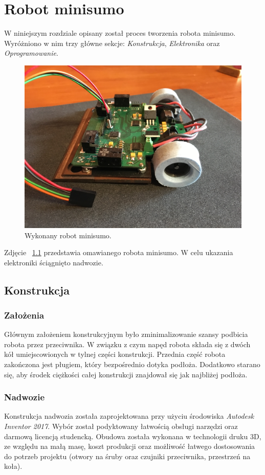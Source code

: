 \chapter{Robot minisumo}

W niniejszym rozdziale opisany został proces tworzenia robota minisumo. Wyróżniono w nim trzy główne sekcje: \textit{Konstrukcja}, \textit{Elektronika} oraz \textit{Oprogramowanie}.

\begin{figure}[H]
	\centering
		\includegraphics[width=0.75\linewidth]{pic04/minisumo.JPG}
	\caption{Wykonany robot minisumo.}
	\label{fig:robot}	
\end{figure}

Zdjęcie ~\ref{fig:robot} przedstawia omawianego robota minisumo. W celu ukazania elektroniki ściągnięto nadwozie.

\section{Konstrukcja}
\subsection{Założenia}
Głównym założeniem konstrukcyjnym było zminimalizowanie szansy podbicia robota przez przeciwnika. W związku z czym napęd robota składa się z dwóch kół umiejscowionych w tylnej części konstrukcji. Przednia część robota zakończona jest pługiem, który bezpośrednio dotyka podłoża. Dodatkowo starano się, aby środek ciężkości całej konstrukcji znajdował się jak najbliżej podłoża.

\subsection{Nadwozie}
Konstrukcja nadwozia została zaprojektowana przy użyciu środowiska \textit{Autodesk Inventor 2017}. Wybór został podyktowany łatwością obsługi narzędzi oraz darmową licencją studencką. Obudowa została wykonana w technologii druku 3D, ze względu na małą masę, koszt produkcji oraz możliwość łatwego dostosowania do potrzeb projektu (otwory na śruby oraz czujniki przeciwnika, przestrzeń na koła).  

